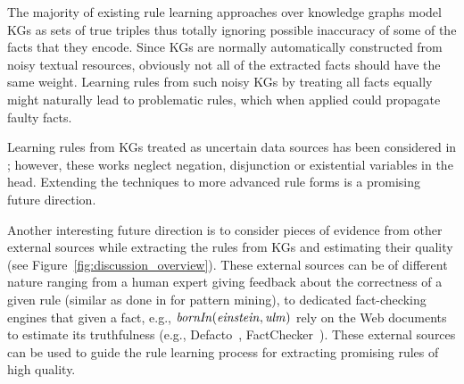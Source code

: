 The majority of existing rule learning approaches over knowledge graphs model KGs as sets of true triples thus totally ignoring possible inaccuracy of some of the facts that they encode. Since KGs are normally automatically constructed from noisy textual resources, obviously not all of the extracted facts should have the same weight. Learning rules from such noisy KGs by treating all facts equally might naturally lead to problematic rules, which when applied could propagate faulty facts. 

Learning rules from KGs treated as uncertain data sources has  been considered in \cite{probfoil,DBLP:conf/ijcai/RaedtDTBV15,DBLP:conf/clima/CorapiSIR11}; however, these works neglect negation, disjunction or existential variables in the head. %
Extending the techniques to more advanced rule forms is a promising future direction. %


Another interesting future direction is to consider pieces of evidence from other external sources while extracting the rules from KGs and estimating their quality 
(see Figure~\ref{fig:discussion_overview}). These external sources can be of different nature ranging from %
a human expert giving feedback about the correctness of a given rule (similar as done in \cite{Dzyuba2017} for pattern mining), to dedicated fact-checking engines that given a fact, e.g., $\mathit{bornIn(einstein,ulm)}$ rely on the Web documents to estimate its truthfulness (e.g., Defacto~\cite{defacto}, FactChecker~\cite{factchecker}). These external sources can be used to guide the rule learning process for extracting promising rules of high quality.


